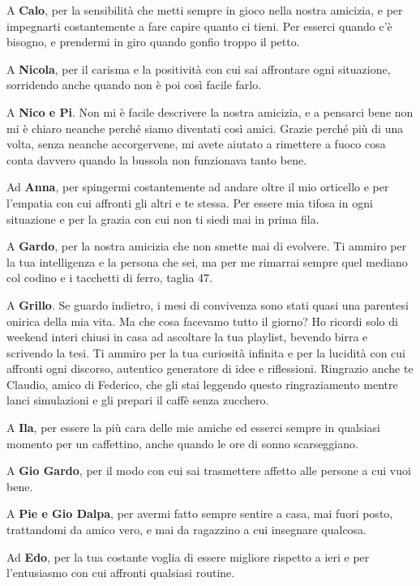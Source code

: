 {A \textbf{Calo}, per la sensibilità che metti sempre in gioco nella nostra amicizia, e per impegnarti costantemente a fare capire quanto ci tieni. Per esserci quando c’è bisogno, e prendermi in giro quando gonfio troppo il petto.

A \textbf{Nicola}, per il carisma e la positività con cui sai affrontare ogni situazione, sorridendo anche quando non è poi così facile farlo.

A \textbf{Nico e Pi}. Non mi è facile descrivere la nostra amicizia, e a pensarci bene non mi è chiaro neanche perché siamo diventati così amici. Grazie perché più di una volta, senza neanche accorgervene, mi avete aiutato a rimettere a fuoco cosa conta davvero quando la bussola non funzionava tanto bene.

Ad \textbf{Anna}, per spingermi costantemente ad andare oltre il mio orticello e per l’empatia con cui affronti gli altri e te stessa. Per essere mia tifosa in ogni situazione e per la grazia con cui non ti siedi mai in prima fila.

A \textbf{Gardo}, per la nostra amicizia che non smette mai di evolvere. Ti ammiro per la tua intelligenza e la persona che sei, ma per me rimarrai sempre quel mediano col codino e i tacchetti di ferro, taglia 47.

A \textbf{Grillo}. Se guardo indietro, i mesi di convivenza sono stati quasi una parentesi onirica della mia vita. Ma che cosa facevamo tutto il giorno? Ho ricordi solo di weekend interi chiusi in casa ad ascoltare la tua playlist, bevendo birra e scrivendo la tesi. Ti ammiro per la tua curiosità infinita e per la lucidità con cui affronti ogni discorso, autentico generatore di idee e riflessioni. Ringrazio anche te Claudio, amico di Federico, che gli stai leggendo questo ringraziamento mentre lanci simulazioni e gli prepari il caffè senza zucchero.

A \textbf{Ila}, per essere la più cara delle mie amiche ed esserci sempre in qualsiasi momento per un caffettino, anche quando le ore di sonno scarseggiano.

A \textbf{Gio Gardo}, per il modo con cui sai trasmettere affetto alle persone a cui vuoi bene.

A \textbf{Pie e Gio Dalpa}, per avermi fatto sempre sentire a casa, mai fuori posto, trattandomi da amico vero, e mai da ragazzino a cui insegnare qualcosa.

Ad \textbf{Edo}, per la tua costante voglia di essere migliore rispetto a ieri e per l’entusiasmo con cui affronti qualsiasi routine.

}
